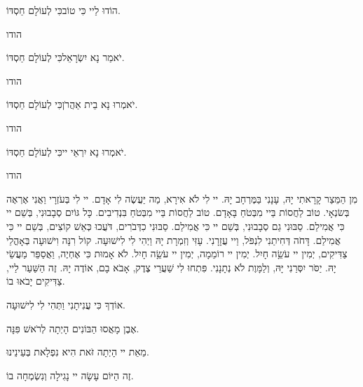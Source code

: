 {

\vspace{0.5em}

הוֹדוּ לַיי כִּי טוֹב\hfill כִּי לְעוֹלָם חַסְדּוֹ.


\hfill{\instructionfont
הודו
}

יֹאמַר נָא יִשְׂרָאֵל\hfill כִּי לְעוֹלָם חַסְדּוֹ.

\hfill{\instructionfont
הודו
}

יֹאמְרוּ נָא בֵית אַהֲרֹן\hfill כִּי לְעוֹלָם חַסְדּוֹ.

\hfill{\instructionfont
הודו
}

יֹאמְרוּ נָא יִרְאֵי יי\hfill כִּי לְעוֹלָם חַסְדּוֹ.

\hfill{\instructionfont
הודו
}

\vspace{0.5em}

מִן הַמֵּצַר קָרָאתִי יָהּ, עָנָנִי בַּמֶּרְחָב יָהּ. יי לִי לֹא אִירָא, מַה יַּעֲשֶׂה לִי אָדָם. יי לִי בְּעֹזְרָי וַאֲנִי אֶרְאֶה בְּשׂנְאָי. טוֹב לַחֲסוֹת בַּיי מִבְּטֹחַ בָּאָדָם. טוֹב לַחֲסוֹת בַּיי מִבְּטֹחַ בִּנְדִיבִים. כָּל גּוֹיִם סְבָבוּנִי, בְּשֵׁם יי כִּי אֲמִילַם. סַבּוּנִי גַם סְבָבוּנִי, בְּשֵׁם יי כִּי אֲמִילַם. סַבּוּנִי כִדְּבֹרִים, דֹּעֲכוּ כְּאֵשׁ קוֹצִים, בְּשֵׁם יי כִּי אֲמִילַם. דָּחֹה דְּחִיתַנִי לִנְפֹּל, וַיי עֲזָרָנִי. עָזִּי וְזִמְרָת יָהּ וַיְהִי לִי לִישׁוּעָה. קוֹל רִנָּה וִישׁוּעָה בְּאָהֳלֵי צַדִּיקִים, יְמִין יי עֹשֵָׂה חָיִל. יְמִין יי רוֹמֵמָה, יְמִין יי עֹשֵָׂה חָיִל. לֹא אָמוּת כִּי אֶחְיֶה, וַאֲסַפֵּר מַעֲשֵׂי יָהּ. יַסֹּר יִסְּרַנִי יָּהּ, וְלַמָּוֶת לֹא נְתָנָנִי. פִּתְחוּ לִי שַׁעֲרֵי צֶדֶק, אָבֹא בָם, אוֹדֶה יָהּ. 
זֶה הַשַּׁעַר לַיי, צַדִּיקִים יָבֹאוּ בוֹ. 

\vspace{1em}

\noindent
אוֹדְךָ כִּי עֲנִיתָנִי וַתְּהִי לִי לִישׁוּעָה. 

\noindent
אֶבֶן מָאֲסוּ הַבּוֹנִים הָיְתָה לְרֹאשׁ פִּנָּה. 

\noindent
מֵאֵת יי הָיְתָה זֹּאת הִיא נִפְלָאת בְּעֵינֵינוּ. 

\noindent
זֶה הַיּוֹם עָשָׂה יי נָגִילָה וְנִשְׂמְחָה בוֹ.
}

